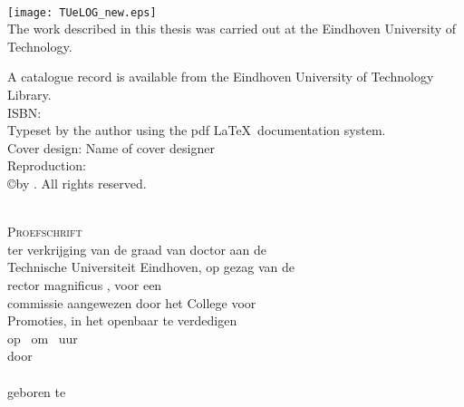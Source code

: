 \thispagestyle{empty}
\vspace*{30mm}\noindent
\begin{center}
{\LARGE\sf\maintitle}\\[4.5cm] %
{\Large\sf \@author}
\end{center}

\newpage
\thispagestyle{empty}

\vspace*{\fill}

\hspace*{-7mm}\texttt{[image: TUeLOG\_new.eps]}\\
{\small The work described in this thesis was carried out at the Eindhoven University of
Technology.}\\[8mm]

\noindent\bgroup\small

\noindent\bgroup\small
A catalogue record is available from the Eindhoven University of Technology Library.\\
ISBN: \isbn\\[4mm]
Typeset by the author using the pdf \LaTeX \ documentation system.\\
Cover design: Name of cover designer \\
Reproduction: \printer\\[8mm]
\copyright\year by \@author. All rights reserved.}
\egroup

\newpage
\thispagestyle{empty}



\vspace*{30mm}
\begin{center}
{\LARGE\sf\maintitle}\\[30mm] %
{\large\textsc{Proefschrift}}\\[8mm]
ter verkrijging van de graad van doctor aan de\\
Technische Universiteit Eindhoven, op gezag van de\\
rector magnificus \rector, voor een\\
commissie aangewezen door het College voor\\
Promoties, in het openbaar te verdedigen\\
op \ om \ uur\\[8mm]
door\\[8mm]
\@author\\[8mm]
geboren te \placeofbirth
\end{center}
\vfill

